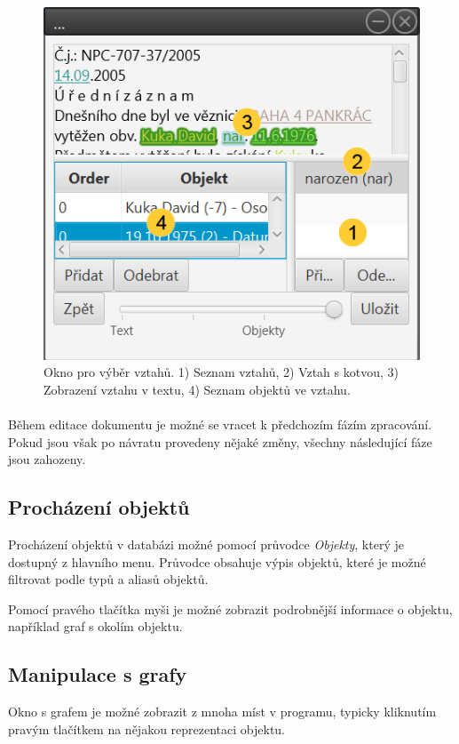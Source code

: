\documentclass[12pt,a4paper]{report}
\begin{document}
\begin{figure}[!htb]
	\centering
	\includegraphics[width=\textwidth]{vztahy}
	\caption{Okno pro výběr vztahů. 1) Seznam vztahů, 2) Vztah s kotvou, 3) Zobrazení vztahu v textu, 4) Seznam objektů ve vztahu.}	
	\label{fig:Vztahy}
\end{figure}

\paragraph{}
Během editace dokumentu je možné se vracet k předchozím fázím zpracování. Pokud jsou však po návratu provedeny nějaké změny, všechny následující fáze jsou zahozeny.

\subsection{Procházení objektů}
Procházení objektů v databázi možné pomocí průvodce \emph{Objekty}, který je dostupný z hlavního menu. Průvodce obsahuje výpis objektů, které je možné filtrovat podle typů a aliasů objektů.

Pomocí pravého tlačítka myši je možné zobrazit podrobnější informace o objektu, například graf s okolím objektu.

\subsection{Manipulace s grafy}
Okno s grafem je možné zobrazit z mnoha míst v programu, typicky kliknutím pravým tlačítkem na nějakou reprezentaci objektu.
\end{document}
